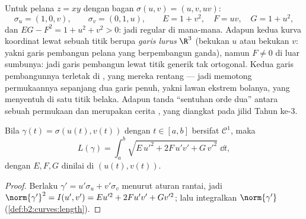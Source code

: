 \begin{example}\label{ex:b2:surfaces:saddlechart}
Untuk pelana $z = xy$ dengan bagan $\sigma(u, v) = (u, v,
uv)$:
\[
\sigma_u = (1, 0, v), \qquad \sigma_v = (0, 1, u),
\qquad
E = 1 + v^2, \quad F = uv, \quad G = 1 + u^2 ,
\]
dan $EG - F^2 = 1 + u^2 + v^2 > 0$: jadi regular di mana-mana. Adapun
kedua kurva koordinat lewat sebuah titik berupa \emph{garis
lurus} $\R^3$ (bekukan $u$ atau bekukan $v$: yakni garis pembangun
pelana yang berpembangun ganda), namun $F \neq 0$ di luar sumbunya: jadi garis pembangun
lewat titik generik tak ortogonal. Kedua garis pembangunnya terletak
di , yang mereka rentang --- jadi  memotong permukaannya sepanjang dua garis penuh, yakni lawan
ekstrem bolanya, yang  menyentuh di satu
titik belaka. Adapun tanda ``sentuhan orde dua'' antara
sebuah permukaan dan  merupakan cerita ,
yang diangkat pada jilid Tahun ke-3.
\end{example}

\begin{proposition}\label{prop:b2:surfaces:curvelength}
Bila $\gamma(t) = \sigma(u(t), v(t))$ dengan $t \in [a, b]$ bersifat
$\mathcal{C}^1$, maka
\[
L(\gamma) = \int_a^b
\sqrt{E\,u'^2 + 2F\,u'v' + G\,v'^2}\;\dd t ,
\]
dengan $E, F, G$ dinilai di $(u(t), v(t))$.
\end{proposition}

\begin{proof}
Berlaku $\gamma' = u'\sigma_u + v'\sigma_v$ menurut aturan rantai, jadi
$\norm{\gamma'}^2 = I(u', v') = Eu'^2 + 2Fu'v' + Gv'^2$; lalu integralkan
$\norm{\gamma'}$ (\cref{def:b2:curves:length}).
\end{proof}

